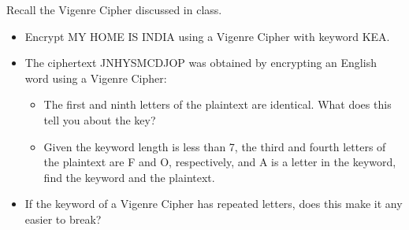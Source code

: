 \documentclass[10pt, a4paper]{article}
\begin{document}
\newpage
\begin{Problem}
    Recall the Vigenre Cipher discussed in class.
    \begin{itemize}
        \item  Encrypt MY HOME IS INDIA using a Vigenre Cipher with keyword KEA.
        \item The ciphertext JNHYSMCDJOP was obtained by encrypting an English word using a
              Vigenre Cipher:
              \begin{itemize}
                  \item The first and ninth letters of the plaintext are identical. What does this tell you
                        about the key?
                  \item Given the keyword length is less than 7, the third and fourth letters of the plaintext
                        are F and O, respectively, and A is a letter in the keyword, find the keyword and the
                        plaintext.
              \end{itemize}
        \item
              If the keyword of a Vigenre Cipher has repeated letters, does this make it any easier to
              break?
    \end{itemize}
\end{Problem}
\end{document}
